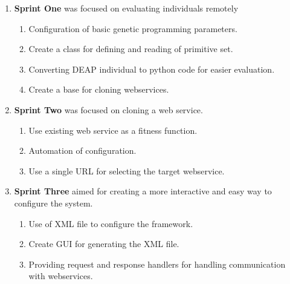 \begin{enumerate}
\item \textbf{Sprint One} was focused on evaluating individuals remotely
	\begin{enumerate}
	\item Configuration of basic genetic programming parameters.
	\item Create a class for defining and reading of primitive set.
	\item Converting DEAP individual to python code for easier evaluation.
	\item Create a base for cloning webservices.
	\end{enumerate}
\item \textbf{Sprint Two} was focused on cloning a web service.
	\begin{enumerate}
	\item Use existing web service as a fitness function.
	\item Automation of configuration.
	\item Use a single URL for selecting the target webservice.
	\end{enumerate}
\item \textbf{Sprint Three} aimed for creating a more interactive and easy way to configure the system.
	\begin{enumerate}
	\item Use of XML file to configure the framework.
	\item Create GUI for generating the XML file.
	\item Providing request and response handlers for handling communication with webservices.
	\end{enumerate}
\end{enumerate}
